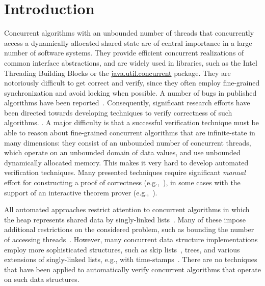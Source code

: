 \section{Introduction}



Concurrent algorithms with an unbounded number of
threads that concurrently access a dynamically allocated shared state
are of central importance in a large number of software systems.
They provide efficient concurrent realizations of
common interface abstractions, and
are widely used in libraries,
such as the Intel Threading Building Blocks or
the \url{java.util.concurrent} package.
They are notoriously difficult to get correct and verify, since they
often employ fine-grained synchronization and avoid locking when
possible. A number of bugs  in published
algorithms have been reported~\cite{DDGJLMMSS:dcas,MiSc:correction}.
Consequently, significant research efforts have been directed towards developing
techniques to verify correctness of such algorithms.
.
A major difficulty is that a successful verification technique must be
able to reason about fine-grained concurrent algorithms that are infinite-state
in many dimensions: 
they consist of an unbounded number of concurrent threads, which
operate on an unbounded domain of data values, and use
unbounded dynamically allocated memory. 
This makes it very hard to develop automated verification techniques.
Many presented techniques require significant {\em manual} effort for
constructing a proof of correctness
(e.g.,~\cite{LF:pldi13,Vafeiadis:Thesis}),
in some cases with the support of an interactive theorem prover
(e.g.,~\cite{Aaron:locigcal:linearizability,Colvin:Lazy-List,Derrick:fm14,SWD:cav12,SDW:tcl14}).

All automated approaches restrict attention to concurrent algorithms in which
the heap represents shared data by singly-linked
lists~\cite{AHHR:integrated,meyer:vmcai16,Quy:sas16,Sagiv:correlation,Vafeiadis:cav10}. Many of these impose additional restrictions on the considered problem,
such as bounding the number of accessing
threads~\cite{Amit:comparisonAbstraction,Vechev:spin09,CernyRZCA:CAV10}.
However, many concurrent data structure implementations employ more
sophisticated structures, such as skip
lists~\cite{Fomitchev:2004,ArtOfMpP,Sundell:2005}, trees, and various extensions
of singly-linked lists, e.g., with time-stamps~\cite{ts-stack}.  There are no
techniques that have been applied to automatically verify concurrent algorithms
that operate on such data structures.

